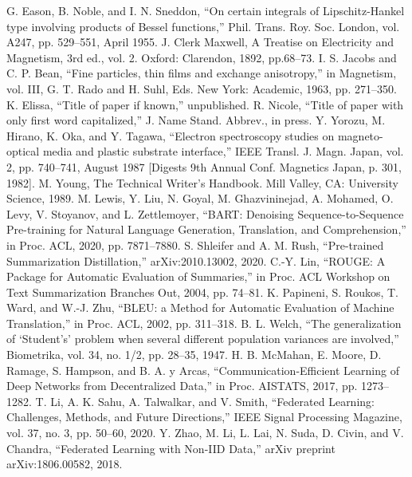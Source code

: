 \documentclass[conference]{IEEEtran}
\begin{document}
\newpage
\begin{thebibliography}{00}
 G. Eason, B. Noble, and I. N. Sneddon, ``On certain integrals of Lipschitz-Hankel type involving products of Bessel functions,'' Phil. Trans. Roy. Soc. London, vol. A247, pp. 529--551, April 1955.
 J. Clerk Maxwell, A Treatise on Electricity and Magnetism, 3rd ed., vol. 2. Oxford: Clarendon, 1892, pp.68--73.
 I. S. Jacobs and C. P. Bean, ``Fine particles, thin films and exchange anisotropy,'' in Magnetism, vol. III, G. T. Rado and H. Suhl, Eds. New York: Academic, 1963, pp. 271--350.
 K. Elissa, ``Title of paper if known,'' unpublished.
 R. Nicole, ``Title of paper with only first word capitalized,'' J. Name Stand. Abbrev., in press.
 Y. Yorozu, M. Hirano, K. Oka, and Y. Tagawa, ``Electron spectroscopy studies on magneto-optical media and plastic substrate interface,'' IEEE Transl. J. Magn. Japan, vol. 2, pp. 740--741, August 1987 [Digests 9th Annual Conf. Magnetics Japan, p. 301, 1982].
 M. Young, The Technical Writer's Handbook. Mill Valley, CA: University Science, 1989.
 M. Lewis, Y. Liu, N. Goyal, M. Ghazvininejad, A. Mohamed, O. Levy, V. Stoyanov, and L. Zettlemoyer, ``BART: Denoising Sequence-to-Sequence Pre-training for Natural Language Generation, Translation, and Comprehension,'' in Proc. ACL, 2020, pp. 7871--7880.
 S. Shleifer and A. M. Rush, ``Pre-trained Summarization Distillation,'' arXiv:2010.13002, 2020.
 C.-Y. Lin, ``ROUGE: A Package for Automatic Evaluation of Summaries,'' in Proc. ACL Workshop on Text Summarization Branches Out, 2004, pp. 74--81.
 K. Papineni, S. Roukos, T. Ward, and W.-J. Zhu, ``BLEU: a Method for Automatic Evaluation of Machine Translation,'' in Proc. ACL, 2002, pp. 311--318.
 B. L. Welch, ``The generalization of `Student's' problem when several different population variances are involved,'' Biometrika, vol. 34, no. 1/2, pp. 28--35, 1947.
 H. B. McMahan, E. Moore, D. Ramage, S. Hampson, and B. A. y Arcas, ``Communication-Efficient Learning of Deep Networks from Decentralized Data,'' in Proc. AISTATS, 2017, pp. 1273--1282.
 T. Li, A. K. Sahu, A. Talwalkar, and V. Smith, ``Federated Learning: Challenges, Methods, and Future Directions,'' IEEE Signal Processing Magazine, vol. 37, no. 3, pp. 50--60, 2020.
 Y. Zhao, M. Li, L. Lai, N. Suda, D. Civin, and V. Chandra, ``Federated Learning with Non-IID Data,'' arXiv preprint arXiv:1806.00582, 2018.
\end{thebibliography}
\vspace{12pt}
\end{document}
